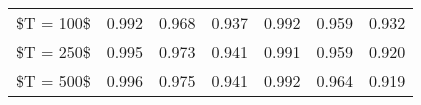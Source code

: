 % 
\begin{tabular}{ccccccc}
  \hline
  \hline
\$T = 100\$ & 0.992 & 0.968 & 0.937 & 0.992 & 0.959 & 0.932 \\ 
  \$T = 250\$ & 0.995 & 0.973 & 0.941 & 0.991 & 0.959 & 0.920 \\ 
  \$T = 500\$ & 0.996 & 0.975 & 0.941 & 0.992 & 0.964 & 0.919 \\ 
   \hline
\end{tabular}

